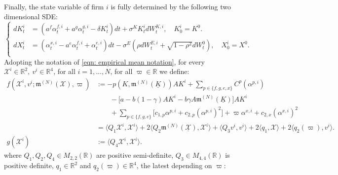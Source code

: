 \documentclass[10pt,a4paper]{amsart}
\numberwithin{equation}{section}
\newcommand{\w}{\varpi}
\newcommand{\R}{\mathbb{R}}
\begin{document}
Finally, the state variable of firm $i$ is fully determined by the following two dimensional SDE: 
\begin{equation*}
\begin{cases}
dK^i_t &= (a^f \alpha^{f,i}_t + a^g \alpha^{g,i}_t - \delta K^i_t) dt + \sigma^K K^i_t dW^{K,i}_t, \quad K^i_0=K^0.\\
dX^i_t &= (\alpha^{x,i}_t - a^e \alpha^{f,i}_t + \alpha^{e,i}_t) dt -\sigma^E(\rho dW^{E,i}_t + \sqrt{1- \rho^2} dW^0_t), \quad X^i_0=X^0.\\
\end{cases}
\end{equation*}
Adopting the notation of \eqref{eqn: empirical mean notation}, for every $\mathcal{X}^i\in \R^2,\  v^i\in \R^4$, for all $i = 1,\dots,N$, for all $\w\in\R$ we define:
\begin{align*}
f(\mathcal{X}^i,v^i;\mathfrak{m}^{(N)}(\mathcal{X}),\w) &:= -p(K,\mathfrak{m}^{(N)}(\underline{K})) AK^i +\sum_{p \in\{ f,g,e,x\}} C^p(\alpha^{p,i}) \\
&\qquad-\Big[ a-b(1-\gamma)AK^i - b\gamma A\mathfrak{m}^{(N)}(\underline{K})\Big]AK^i\\
&\qquad+  \sum_{p \in \{f,g,e\} } \Big[c_{1,p}\alpha^{p,i} + c_{2,p} (\alpha^{p,i})^2\Big]+ \w\alpha^{x,i} + c_{2,x} (\alpha^{x,i})^2\\
 &= \langle Q_1 \mathcal{X}^i ,\mathcal{X}^i\rangle+ 2\langle {Q}_2 \mathfrak{m}^{(N)}(\underline{\mathcal{X}}), \mathcal{X}^i\rangle + \langle Q_3 v^i, v^i\rangle + 2\langle q_1, \mathcal{X}\rangle + 2 \langle q_2(\w),v^i\rangle.\\
g(\mathcal{X}^i)&:= \langle Q_4\mathcal{X}^i, \mathcal{X}^i\rangle.
\end{align*}
where $Q_1,Q_2,Q_4\in M_{2,2}(\mathbb{R})$ are positive semi-definite, $Q_3\in M_{4,4}(\mathbb{R})$ is positive definite, $q_1\in\mathbb{R}^2$ and $q_2(\w)\in\mathbb{R}^4$, the latest depending on $\w$:
\end{document}
